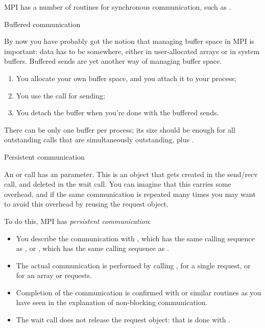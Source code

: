 MPI has a number of routines for synchronous communication,
such as .


 {Buffered communication}

By now you have probably got the notion that managing buffer
space in MPI is important: data has to be somewhere, either in
user-allocated arrays or in system buffers. Buffered sends are yet another
way of managing buffer space.
\begin{enumerate}
\item You allocate your own buffer space, and you attach it to your process;
\item You use the  call for sending;
\item You detach the buffer when you're done with the buffered sends.
\end{enumerate}

There can be only one buffer per process; its size should be enough
for all outstanding  calls that are simultaneously
outstanding, plus .

 {Persistent communication}

An  or  call has an  parameter. This
is an object that gets created in the send/recv call, and deleted in
the wait call. You can imagine that this carries some overhead, and if
the same communication is repeated many times you may want to avoid
this overhead by reusing the request object.

To do this, MPI has \emph{persistent communication}:
\begin{itemize}
\item You describe the communication with
  , which has the same calling sequence as
  , or , which has the same
  calling sequence as .
\item The actual communication is performed by calling
  , for a single request, or
   for an array or requests.
\item Completion of the communication is confirmed with
   or similar routines as you have seen in the
  explanation of non-blocking communication.
\item The wait call does not release the request object: that is done
  with .
\end{itemize}

